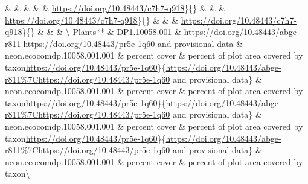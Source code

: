 \documentclass[
  12pt,
]{article}
\begin{document}
 \&  \& \href{https://doi.org/10.48443/9smm-v091|https://doi.org/10.48443/c7h7-q918}{} \&  \&  \& \textbar{}\url{https://doi.org/10.48443/c7h7-q918}\}\{\} \&  \&  \& \textbar{}\url{https://doi.org/10.48443/c7h7-q918}\}\{\} \&  \&  \& \textbar{}\url{https://doi.org/10.48443/c7h7-q918}\}\{\} \&  \&  \& \textbackslash{}
Plants** \& DP1.10058.001 \& \href{https://doi.org/10.48443/abge-r811|https://doi.org/10.48443/pr5e-1q60}{https://doi.org/10.48443/abge-r811|https://doi.org/10.48443/pr5e-1q60 and provisional data} \& neon.ecocomdp.10058.001.001 \& percent cover \& percent of plot area covered by taxon\textbar{}\url{https://doi.org/10.48443/pr5e-1q60}\}\{\url{https://doi.org/10.48443/abge-r811\%7Chttps://doi.org/10.48443/pr5e-1q60} and provisional data\} \& neon.ecocomdp.10058.001.001 \& percent cover \& percent of plot area covered by taxon\textbar{}\url{https://doi.org/10.48443/pr5e-1q60}\}\{\url{https://doi.org/10.48443/abge-r811\%7Chttps://doi.org/10.48443/pr5e-1q60} and provisional data\} \& neon.ecocomdp.10058.001.001 \& percent cover \& percent of plot area covered by taxon\textbar{}\url{https://doi.org/10.48443/pr5e-1q60}\}\{\url{https://doi.org/10.48443/abge-r811\%7Chttps://doi.org/10.48443/pr5e-1q60} and provisional data\} \& neon.ecocomdp.10058.001.001 \& percent cover \& percent of plot area covered by taxon\textbackslash{}
\end{document}
